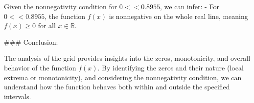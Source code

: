 Given the nonnegativity condition for \( 0 < < 0.8955 \), we can infer:
- For \( 0 < < 0.8955 \), the function \( f(x) \) is nonnegative on the whole real line, meaning \( f(x) \geq 0 \) for all \( x \in \mathbb{R} \).

### Conclusion:

The analysis of the grid provides insights into the zeros, monotonicity, and overall behavior of the function \( f(x) \). By identifying the zeros and their nature (local extrema or monotonicity), and considering the nonnegativity condition, we can understand how the function behaves both within and outside the specified intervals.